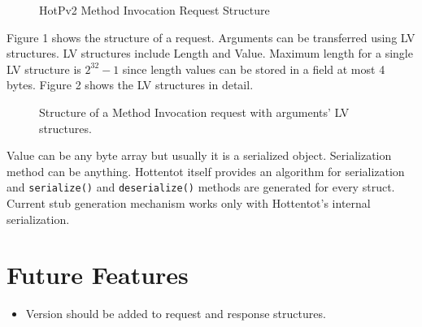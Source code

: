\documentclass[10pt,a4paper]{article}
\begin{document}
\begin{figure}[!ht]
  \caption{HotPv2 Method Invocation Request Structure}
  \centering
\end{figure}

Figure 1 shows the structure of a request. Arguments can be transferred using LV structures. LV structures include Length and Value. Maximum length for a single LV structure is $2^{32} - 1$ since length values can be stored in a field at most 4 bytes. Figure 2 shows the LV structures in detail.

\begin{figure}[!ht]
  \caption{Structure of a Method Invocation request with arguments' LV structures.}
  \centering
\end{figure}

Value can be any byte array but usually it is a serialized object. Serialization method can be anything. Hottentot itself provides an algorithm for serialization and \texttt {serialize()} and \texttt {deserialize()} methods are generated for every struct. Current stub generation mechanism works only with Hottentot's internal serialization.

\section {Future Features}
\begin{itemize}
  \item Version should be added to request and response structures.
\end{itemize}
\end{document}

